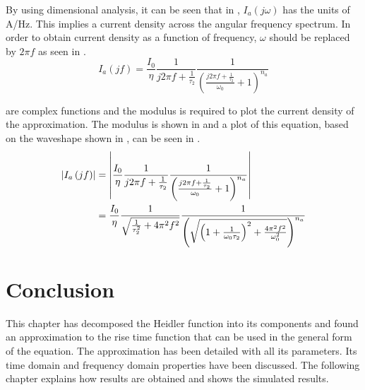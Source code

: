 By using dimensional analysis, it can be seen that in , $I_a(j\omega)$ has the units of A/Hz. This implies a current density across the angular frequency spectrum. In order to obtain current density as a function of frequency, $\omega$ should be replaced by $2 \pi f$ as seen in .
\begin{equation}
    I_a \left( jf \right) = \frac{I_0}{\eta}\frac{1}{j2\pi f + \frac{1}{\tau_2}}\frac{1}{\left ( \frac{j2\pi f + \frac{1}{\tau_2}}{\omega_0} + 1 \right )^{n_a}}
    \label{eqn:approx_fourier_freq}
\end{equation}

 are complex functions and the modulus is required to plot the current density of the approximation. The modulus is shown in  and a plot of this equation, based on the waveshape shown in , can be seen in .
\begin{align}
    \left | I_a \left( jf \right) \right | & = \left | \frac{I_0}{\eta}\frac{1}{j2\pi f + \frac{1}{\tau_2}}\frac{1}{\left ( \frac{j2\pi f + \frac{1}{\tau_2}}{\omega_0} + 1 \right )^{n_a}} \right | \notag\\
    & = \frac{I_0}{\eta} \frac{1}{\sqrt{ \frac{1}{\tau _2^{2}} + 4 \pi^2 f^2}} \frac{1}{\left ( \sqrt{\left ( 1 + \frac{1}{\omega_0 \tau_2} \right )^2 + \frac{4 \pi^2 f^2}{\omega_{0}^{2}}} \right )^{n_a}}
    \label{eqn:approx_fourier_mod}
\end{align}

\section{Conclusion}
\label{sec:approx_conclusion}
This chapter has decomposed the Heidler function into its components and found an approximation to the rise time function that can be used in the general form of the equation. The approximation has been detailed with all its parameters. Its time domain and frequency domain properties have been discussed. The following chapter explains how results are obtained and shows the simulated results.
